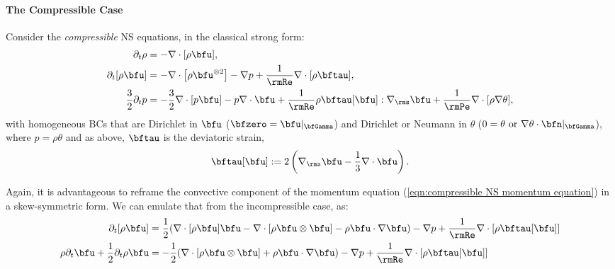 \paragraph*{The Compressible Case}
    Consider the \emph{compressible} NS equations, in the classical strong form:
    \begin{align}
                \partial_{t}\rho  &=  - \nabla\cdot[\rho\bfu],  \label{eqn:compressible NS mass equation}  \\
          \partial_{t}[\rho\bfu]  &=  - \nabla\cdot\left[\rho\bfu^{\otimes 2}\right] - \nabla p + \frac{1}{\rmRe}\nabla\cdot[\rho\bftau],  \label{eqn:compressible NS momentum equation}  \\
        \frac{3}{2}\partial_{t}p  &=  - \frac{3}{2}\nabla\cdot[p\bfu] - p\nabla\cdot\bfu + \frac{1}{\rmRe}\rho\bftau[\bfu]:\nabla_{\rms}\bfu + \frac{1}{\rmPe}\nabla\cdot[\rho\nabla\theta],  \label{eqn:compressible NS energy equation}
    \end{align}
    with homogeneous BCs that are Dirichlet in $\bfu$ ($\bfzero  =  \bfu|_{\bfGamma}$) and Dirichlet or Neumann in $\theta$ ($0  =  \theta \text{ or } \nabla\theta\cdot\bfn|_{\bfGamma}$), where $p = \rho\theta$ and as above, $\bftau$ is the deviatoric strain,
    \begin{equation}
        \bftau[\bfu]  :=  2\left(\nabla_{\rms}\bfu - \frac{1}{3}\nabla\cdot\bfu\right).
    \end{equation}

    Again, it is advantageous to reframe the convective component of the momentum equation (\ref{eqn:compressible NS momentum equation}) in a skew-symmetric form. We can emulate that from the incompressible case, as:
    \begin{align}
        \partial_{t}[\rho\bfu]  &=  \frac{1}{2}(\nabla\cdot[\rho\bfu]\bfu - \nabla\cdot\left[\rho\bfu\otimes\bfu\right] - \rho\bfu\cdot\nabla\bfu) - \nabla p + \frac{1}{\rmRe}\nabla\cdot[\rho\bftau[\bfu]]  \\
        \rho\partial_{t}\bfu + \frac{1}{2}\partial_{t}\rho\bfu  &=  - \frac{1}{2}(\nabla\cdot\left[\rho\bfu\otimes\bfu\right] + \rho\bfu\cdot\nabla\bfu) - \nabla p + \frac{1}{\rmRe}\nabla\cdot[\rho\bftau[\bfu]]  \label{eqn:compressible NS skew-symmetric momentum equation}
    \end{align}

